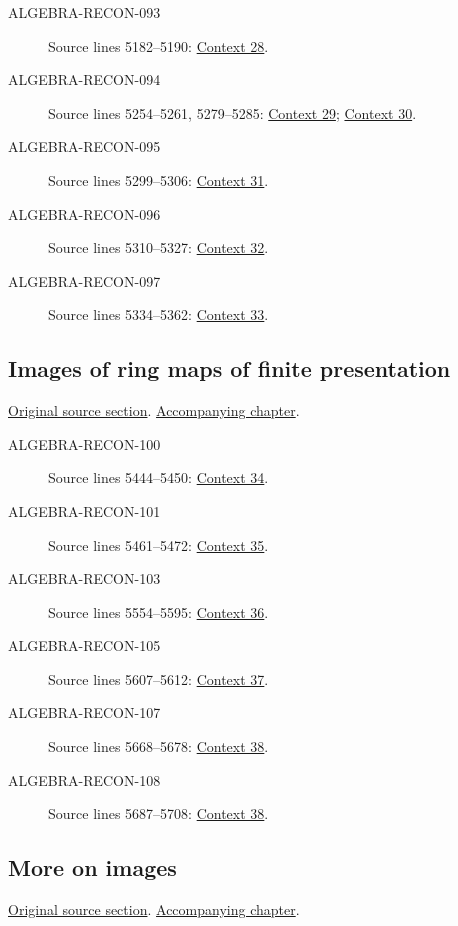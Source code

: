 \begin{description}
\item[ALGEBRA-RECON-093] Source lines 5182--5190: \hyperlink{algebra-context-028}{Context 28}.
\item[ALGEBRA-RECON-094] Source lines 5254--5261, 5279--5285: \hyperlink{algebra-context-029}{Context 29}; \hyperlink{algebra-context-030}{Context 30}.
\item[ALGEBRA-RECON-095] Source lines 5299--5306: \hyperlink{algebra-context-031}{Context 31}.
\item[ALGEBRA-RECON-096] Source lines 5310--5327: \hyperlink{algebra-context-032}{Context 32}.
\item[ALGEBRA-RECON-097] Source lines 5334--5362: \hyperlink{algebra-context-033}{Context 33}.
\end{description}

\subsection{Images of ring maps of finite presentation}
\hypertarget{algebra-source-section-images-finite-presentation}{}
\noindent\href{https://github.com/stacks/stacks-project/blob/a04446e57ec1fbc252a871afcec7752fb2807b14/algebra.tex\#L5371}{Original source section}. \href{algebra.pdf\#nameddest=section-images-finite-presentation}{Accompanying chapter}.

\begin{description}
\item[ALGEBRA-RECON-100] Source lines 5444--5450: \hyperlink{algebra-context-034}{Context 34}.
\item[ALGEBRA-RECON-101] Source lines 5461--5472: \hyperlink{algebra-context-035}{Context 35}.
\item[ALGEBRA-RECON-103] Source lines 5554--5595: \hyperlink{algebra-context-036}{Context 36}.
\item[ALGEBRA-RECON-105] Source lines 5607--5612: \hyperlink{algebra-context-037}{Context 37}.
\item[ALGEBRA-RECON-107] Source lines 5668--5678: \hyperlink{algebra-context-038}{Context 38}.
\item[ALGEBRA-RECON-108] Source lines 5687--5708: \hyperlink{algebra-context-038}{Context 38}.
\end{description}

\subsection{More on images}
\hypertarget{algebra-source-section-more-images}{}
\noindent\href{https://github.com/stacks/stacks-project/blob/a04446e57ec1fbc252a871afcec7752fb2807b14/algebra.tex\#L5721}{Original source section}. \href{algebra.pdf\#nameddest=section-more-images}{Accompanying chapter}.

